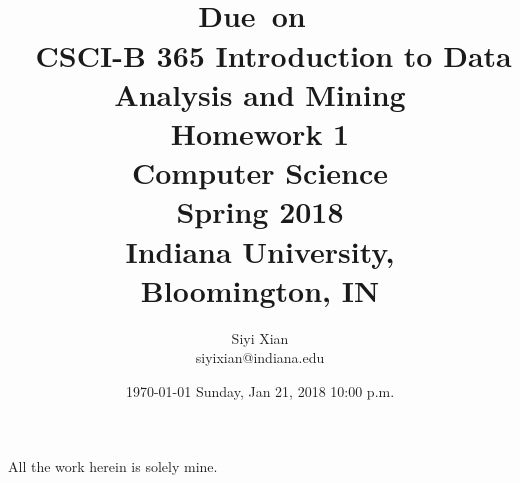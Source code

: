 \documentclass{article}
\title{
\vspace{2in}
\textmd{\textbf{\hmwkClass\ \hmwkTitle}}\\
\normalsize\vspace{0.1in}\small{Due\ on\ \hmwkDueDate}\\
\vspace{0.1in}\large{\textit{\hmwkClassInstructor\ }}
\vspace{3in}
}
\author{\textbf{\hmwkAuthorName}}
\date{\today} %
\begin{document}
\title{ CSCI-B 365 Introduction to Data Analysis and Mining\\
Homework 1 \\
Computer Science \\
Spring 2018 \\Indiana University,\\ Bloomington, IN}
\author{ Siyi Xian \\ siyixian@indiana.edu}
\date{ Sunday, Jan 21,  2018 10:00 p.m. }
\maketitle
All the work herein is solely mine.

\maketitle



\newpage
\newpage



\end{document}
